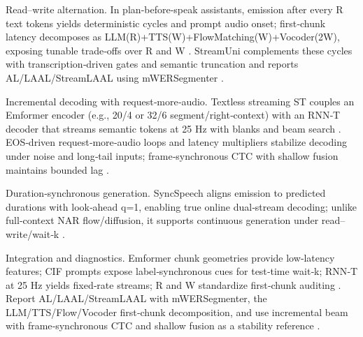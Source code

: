 \documentclass{article}
\begin{document}
Read–write alternation. In plan‑before‑speak assistants, emission after every R text tokens yields deterministic cycles and prompt audio onset; first‑chunk latency decomposes as LLM(R)+TTS(W)+FlowMatching(W)+Vocoder(2W), exposing tunable trade‑offs over R and W \cite{fang2025llamaomni2llmbasedrealtimespokenchatbota}. StreamUni complements these cycles with transcription‑driven gates and semantic truncation and reports AL/LAAL/StreamLAAL using mWERSegmenter \cite{guo2025streamuniachievingstreamingspeechtransla}.

Incremental decoding with request‑more‑audio. Textless streaming ST couples an Emformer encoder (e.g., 20/4 or 32/6 segment/right‑context) with an RNN‑T decoder that streams semantic tokens at 25 Hz with blanks and beam search \cite{zhao2024textlessstreamingspeechtranslationsemant}. EOS‑driven request‑more‑audio loops and latency multipliers stabilize decoding under noise and long‑tail inputs; frame‑synchronous CTC with shallow fusion maintains bounded lag \cite{ouyang2025cmusiwslt2025simultaneousspeechtranslati,deng2025simuls2sllmunlockingsimultaneousinferenc}.

Duration‑synchronous generation. SyncSpeech aligns emission to predicted durations with look‑ahead q=1, enabling true online dual‑stream decoding; unlike full‑context NAR flow/diffusion, it supports continuous generation under read–write/wait‑k \cite{sheng2025syncspeechlowlatencyefficientdualstreamt}.

Integration and diagnostics. Emformer chunk geometries provide low‑latency features; CIF prompts expose label‑synchronous cues for test‑time wait‑k; RNN‑T at 25 Hz yields fixed‑rate streams; R and W standardize first‑chunk auditing \cite{zhao2024textlessstreamingspeechtranslationsemant,deng2025simuls2sllmunlockingsimultaneousinferenc,fang2025llamaomni2llmbasedrealtimespokenchatbota}. Report AL/LAAL/StreamLAAL with mWERSegmenter, the LLM/TTS/Flow/Vocoder first‑chunk decomposition, and use incremental beam with frame‑synchronous CTC and shallow fusion as a stability reference \cite{guo2025streamuniachievingstreamingspeechtransla,deng2025simuls2sllmunlockingsimultaneousinferenc,fang2025llamaomni2llmbasedrealtimespokenchatbota}.
\end{document}
